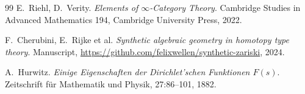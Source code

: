 \documentclass[12pt]{article}
\theoremstyle{definition}
\theoremstyle{remark}
\begin{document}
\begin{thebibliography}{99}
E.\ Riehl, D.\ Verity.
\textit{Elements of $\infty$-Category Theory}.
Cambridge Studies in Advanced Mathematics 194, Cambridge University Press, 2022.

F.\ Cherubini, E.\ Rijke et al.
\textit{Synthetic algebraic geometry in homotopy type theory}.
Manuscript, \url{https://github.com/felixwellen/synthetic-zariski}, 2024.

A.\ Hurwitz.
\textit{Einige Eigenschaften der Dirichlet'schen Funktionen $F(s)$}.
Zeitschrift für Mathematik und Physik, 27:86--101, 1882.

\end{thebibliography}
\end{document}
